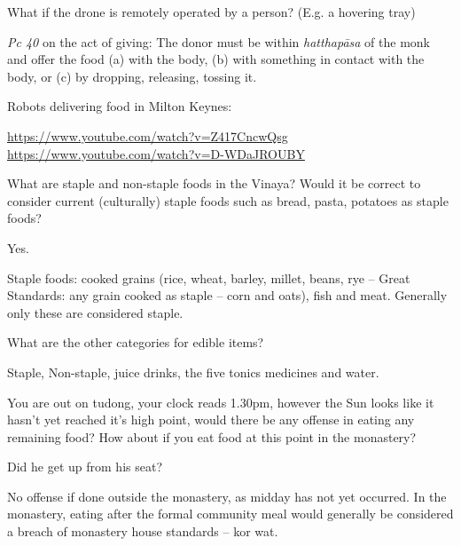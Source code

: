 What if the drone is remotely operated by a person? (E.g. a hovering tray)

\begin{solution}
  \emph{Pc 40} on the act of giving: The donor must be within \emph{hatthapāsa}
  of the monk and offer the food (a) with the body, (b) with something in
  contact with the body, or (c) by dropping, releasing, tossing it.

  Robots delivering food in Milton Keynes:

  \url{https://www.youtube.com/watch?v=Z417CncwQsg}\\
  \url{https://www.youtube.com/watch?v=D-WDaJROUBY}
\end{solution}

\bigskip


What are staple and non-staple foods in the Vinaya?
Would it be correct to consider current (culturally) staple foods such as bread, pasta, potatoes as staple foods?

\begin{solution}
  Yes.

  Staple foods: cooked grains (rice, wheat, barley, millet, beans, rye – Great
  Standards: any grain cooked as staple – corn and oats), fish and meat. Generally
  only these are considered staple.
\end{solution}

\bigskip

What are the other categories for edible items?

\begin{solution}
  Staple, Non-staple, juice drinks, the five tonics medicines and water.
\end{solution}

\bigskip

You are out on tudong, your clock reads 1.30pm, however the Sun looks like it
hasn't yet reached it's high point, would there be any offense in eating any
remaining food? How about if you eat food at this point in the monastery?

\begin{solution}
  Did he get up from his seat?

  No offense if done outside the monastery, as midday has not yet occurred. In
  the monastery, eating after the formal community meal would generally be
  considered a breach of monastery house standards – kor wat.
\end{solution}

